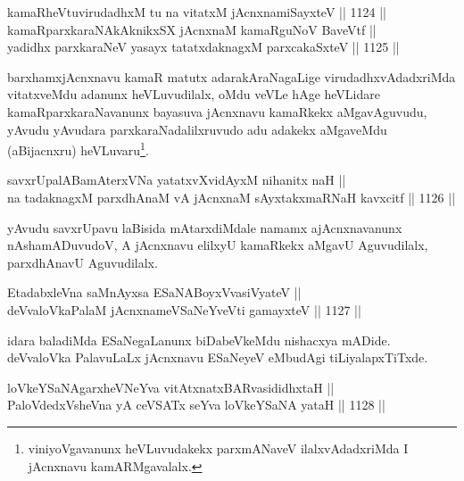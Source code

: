 
\begin{shl}
kamaRheVtuvirudadhxM tu na vitatxM jAcnxnamiSayxteV ||  1124 ||  \\
kamaRparxkaraNAkAknikxSX jAcnxnaM kamaRguNoV BaveVtf || \\
yadidhx parxkaraNeV yasayx tatatxdaknagxM parxcakaSxteV ||  1125 || 
\end{shl}

\begin{artha}
barxhamxjAcnxnavu kamaR matutx adarakAraNagaLige virudadhxvAdadxriMda vitatxveMdu adanunx heVLuvudilalx, oMdu veVLe hAge heVLidare kamaRparxkaraNavanunx bayasuva jAcnxnavu kamaRkekx aMgavAguvudu, yAvudu yAvudara parxkaraNadalilxruvudo adu adakekx aMgaveMdu (aBijacnxru) heVLuvaru\footnote{viniyoVgavanunx heVLuvudakekx parxmANaveV ilalxvAdadxriMda I jAcnxnavu kamARMgavalalx.}.
\end{artha}


\begin{shl}
savxrUpalABamAterxVNa yatatxvXvidAyxM nihanitx naH || \\
na tadaknagxM parxdhAnaM vA jAcnxnaM sAyxtakxmaRNaH kavxcitf ||  1126 ||  
\end{shl}

\begin{artha}
yAvudu savxrUpavu laBisida mAtarxdiMdale namamx ajAcnxnavanunx nAshamADuvudoV, A jAcnxnavu elilxyU kamaRkekx aMgavU Aguvudilalx, parxdhAnavU Aguvudilalx.
\end{artha}

\begin{shl}
EtadabxleVna saMnAyxsa ESaNABoyxV\s vasiVyateV ||  \\
deVvaloVkaPalaM jAcnxnameVSaNeYveVti gamayxteV ||  1127 ||  
\end{shl}

\begin{artha}
idara baladiMda ESaNegaLanunx biDabeVkeMdu nishacxya mADide. deVvaloVka PalavuLaLx jAcnxnavu ESaNeyeV eMbudAgi tiLiyalapxTiTxde.
\end{artha}

\begin{shl}
loVkeYSaNAgarxheVNeYva vitAtxnatxBARvasididhxtaH || \\
PaloVdedxVsheVna yA ceVSATx seYva loVkeYSaNA yataH ||  1128 ||  
\end{shl}

